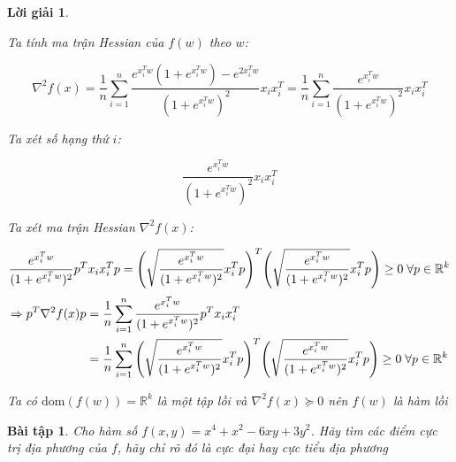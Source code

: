 \documentclass[14pt, a4paper]{article}
\theoremstyle{sltheorem}
\newtheorem{baitap}{Bài tập}
\theoremstyle{soltheorem}
\newtheorem*{loigiai}{Lời giải}
\begin{document}
\begin{loigiai}
\begin{enumerate} [wide, labelwidth=!, labelindent=0pt,label=\textbf{\arabic*}.]
            Ta tính ma trận Hessian của $f(w)$ theo $w$:

            \begin{equation*}
                \nabla^2 f(x) = \dfrac{1}{n}\sum_{i=1}^n \dfrac{e^{x_i^Tw}(1 + e^{x_i^T w})-e^{2x_i^T w}}{(1 + e^{x_i^T w})^2}x_i x_i^T=\dfrac{1}{n}\sum_{i=1}^n \dfrac{e^{x_i^Tw}}{(1 + e^{x_i^T w})^2}x_i x_i^T
            \end{equation*}

            Ta xét số hạng thứ $i$:

            \begin{equation*}
                \dfrac{e^{x_i^Tw}}{(1 + e^{x_i^T w})^2}x_i x_i^T
            \end{equation*}

            Ta xét ma trận Hessian $\nabla^2 f(x)$:

            \begin{equation*}
                \dfrac{e^{x_i^Tw}}{(1 + e^{x_i^T w})^2}p^Tx_i x_i^T p=\Bigg(\sqrt{\dfrac{e^{x_i^Tw}}{(1 + e^{x_i^T w})^2}} x_i^Tp\Bigg)^T\Bigg(\sqrt{\dfrac{e^{x_i^Tw}}{(1 + e^{x_i^T w})^2}} x_i^Tp\Bigg)\geq 0 \thickspace \forall p \in \mathbb{R}^{k}
            \end{equation*}
            \begin{equation*}
                \begin{aligned}
                    \Rightarrow p^T \nabla^2 f(x)p&=\dfrac{1}{n}\sum_{i=1}^n \dfrac{e^{x_i^Tw}}{(1 + e^{x_i^T w})^2}p^Tx_i x_i^T\\
                    &=\dfrac{1}{n}\sum_{i=1}^n \Bigg(\sqrt{\dfrac{e^{x_i^Tw}}{(1 + e^{x_i^T w})^2}} x_i^Tp\Bigg)^T\Bigg(\sqrt{\dfrac{e^{x_i^Tw}}{(1 + e^{x_i^T w})^2}} x_i^Tp\Bigg)\geq 0 \thickspace \forall p \in \mathbb{R}^{k}
                \end{aligned}
            \end{equation*}

            Ta có $\mathrm{dom}(f(w))=\mathbb{R}^{k}$ là một tập lồi và $\nabla^2 f(x) \succeq 0$ nên $f(w)$ là hàm lồi
        \end{enumerate}
        

    \end{loigiai}

    \begin{baitap}
        Cho hàm số $f(x, y) = x^4 + x^2 - 6xy + 3y^2$. Hãy tìm các điểm cực trị địa phương của $f$, hãy chỉ rõ đó là cực đại hay cực tiểu địa phương
    \end{baitap}
\end{document}
